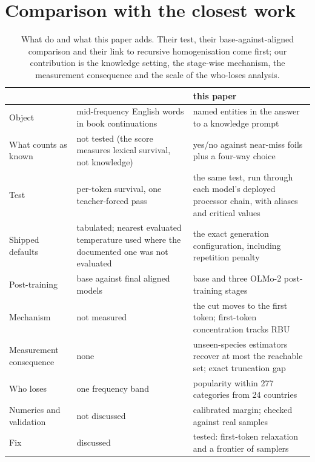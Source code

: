 \documentclass[11pt]{article}
\begin{document}


\section{Comparison with the closest work}\label{app:closest}
\begin{table}[t]
\centering\small
\begin{tabular}{p{}p{}p{}}
\toprule
 & \citet{awad2026lost} & this paper \\
\midrule
Object & mid-frequency English words in book continuations & named entities in the answer to a knowledge prompt \\
What counts as known & not tested (the score measures lexical survival, not knowledge) & yes/no against near-miss foils plus a four-way choice \\
Test & per-token survival, one teacher-forced pass & the same test, run through each model's deployed processor chain, with aliases and critical values \\
Shipped defaults & tabulated; nearest evaluated temperature used where the documented one was not evaluated & the exact generation configuration, including repetition penalty \\
Post-training & base against final aligned models & base and three OLMo-2 post-training stages \\
Mechanism & not measured & the cut moves to the first token; first-token concentration tracks RBU \\
Measurement consequence & none & unseen-species estimators recover at most the reachable set; exact truncation gap \\
Who loses & one frequency band & popularity within 277 categories from 24 countries \\
Numerics and validation & not discussed & calibrated margin; checked against real samples \\
Fix & discussed & tested: first-token relaxation and a frontier of samplers \\
\bottomrule
\end{tabular}
\caption{What \citet{awad2026lost} do and what this paper adds. Their test, their base-against-aligned comparison and their link to recursive homogenisation come first; our contribution is the knowledge setting, the stage-wise mechanism, the measurement consequence and the scale of the who-loses analysis.}
\label{tab:closest}
\end{table}
\end{document}
